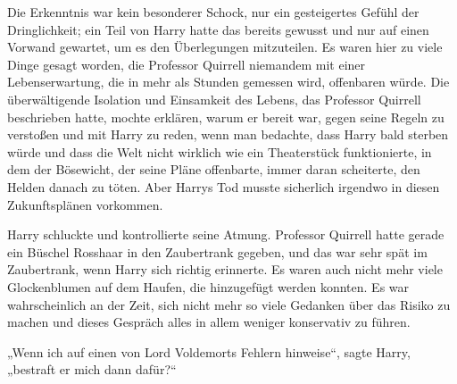 Die Erkenntnis war kein besonderer Schock, nur ein gesteigertes Gefühl der Dringlichkeit; ein Teil von Harry hatte das bereits gewusst und nur auf einen Vorwand gewartet, um es den Überlegungen mitzuteilen. Es waren hier zu viele Dinge gesagt worden, die Professor Quirrell niemandem mit einer Lebenserwartung, die in mehr als Stunden gemessen wird, offenbaren würde.
Die überwältigende Isolation und Einsamkeit des Lebens, das Professor Quirrell beschrieben hatte, mochte erklären, warum er bereit war, gegen seine Regeln zu verstoßen und mit Harry zu reden, wenn man bedachte, dass Harry bald sterben würde und dass die Welt nicht wirklich wie ein Theaterstück funktionierte, in dem der Bösewicht, der seine Pläne offenbarte, immer daran scheiterte, den Helden danach zu töten. Aber Harrys Tod musste sicherlich irgendwo in diesen Zukunftsplänen vorkommen.

Harry schluckte und kontrollierte seine Atmung. Professor Quirrell hatte gerade ein Büschel Rosshaar in den Zaubertrank gegeben, und das war sehr spät im Zaubertrank, wenn Harry sich richtig erinnerte.
Es waren auch nicht mehr viele Glockenblumen auf dem Haufen, die hinzugefügt werden konnten.
Es war wahrscheinlich an der Zeit, sich nicht mehr so viele Gedanken über das Risiko zu machen und dieses Gespräch alles in allem weniger konservativ zu führen.

„Wenn ich auf einen von Lord Voldemorts Fehlern hinweise“, sagte Harry, „bestraft er mich dann dafür?“

